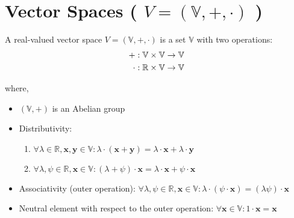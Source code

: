 \section{Vector Spaces ( $V = (\mathbb{V}, +, \cdot)$ ) \cite{mfml-1}}\label{Vector Spaces}

A real-valued vector space $V = (\mathbb{V}, +, \cdot)$ is a set $\mathbb{V}$ with two operations:
\begin{align}
    + &: \mathbb{V} \times \mathbb{V} \rightarrow \mathbb{V}\\ \notag
    \cdot &: \mathbb{R} \times \mathbb{V} \rightarrow \mathbb{V} \notag
\end{align}

where,
\begin{itemize}
    \item $(\mathbb{V}, +)$ is an Abelian group
    \item Distributivity:
    \begin{enumerate}
        \item $\forall \lambda \in \mathbb{R}, \mathbf{x,y}\in \mathbb{V} : \lambda\cdot(\mathbf{x+y}) = \lambda\cdot\mathbf{x} + \lambda\cdot\mathbf{y}$
        
        \item $\forall \lambda,\psi \in \mathbb{R}, \textbf{x}\in \mathbb{V} : (\lambda + \psi) \cdot\textbf{x} = \lambda\cdot\textbf{x} + \psi\cdot\textbf{x}$
        
    \end{enumerate}

    \item Associativity (outer operation): $\forall \lambda,\psi\in\mathbb{R}, \mathbf{x}\in\mathbb{V}: \lambda\cdot(\psi\cdot\mathbf{x}) = (\lambda\psi)\cdot\mathbf{x}$

    \item Neutral element with respect to the outer operation: $\forall \mathbf{x}\in\mathbb{V}:1\cdot\mathbf{x}=\mathbf{x}$
\end{itemize}
\vspace{0.3cm}

